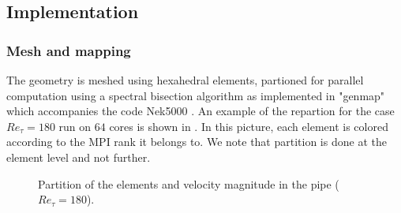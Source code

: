 \documentclass{sig-alternate}
\begin{document}


\subsection{Implementation}
\label{sec:implementation}

\subsubsection{Mesh and mapping}
\label{sec:code}
The geometry is meshed using hexahedral elements, partioned for parallel computation using a spectral bisection algorithm as implemented in "genmap" which accompanies the code Nek5000 \cite{argonne:nekdoc}. An example of the repartion for the case $Re_{\tau} = 180$ run on $64$ cores is shown in . In this picture, each element is colored according to the MPI rank it belongs to. We note that partition is done at the element level and not further.
\begin{figure}
  \centering
  \caption{Partition of the elements and velocity magnitude in the pipe ($Re_{\tau}=180$).}
  \label{fig:partition}
\end{figure}
 
\end{document}
